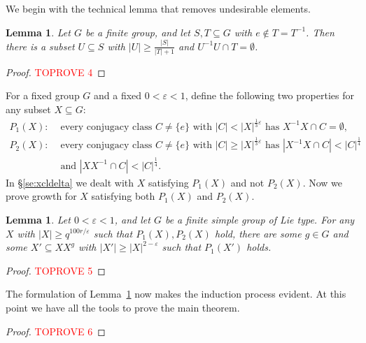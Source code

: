 \documentclass[a4paper]{article}
\newtheorem{lemma}[proposition]{Lemma}
\theoremstyle{definition}
\numberwithin{equation}{section}
\begin{document}
We begin with the technical lemma that removes undesirable elements.

\begin{lemma}\label{le:cutsmall}
Let $G$ be a finite group, and let $S,T\subseteq G$ with $e\notin T=T^{-1}$. Then there is a subset $U\subseteq S$ with $|U|\geq\frac{|S|}{|T|+1}$ and $U^{-1}U\cap T=\emptyset$.
\end{lemma}

\begin{proof}\textcolor{red}{TOPROVE 4}\end{proof}

For a fixed group $G$ and a fixed $0<\varepsilon<1$, define the following two properties for any subset $X\subseteq G$:
\begin{align*}
P_{1}(X): & \text{ every conjugacy class $C\neq\{e\}$ with $|C|<|X|^{\frac{1}{3}\varepsilon}$ has $X^{-1}X\cap C=\emptyset$,} \\
P_{2}(X): & \text{ every conjugacy class $C\neq\{e\}$ with $|C|\geq|X|^{\frac{1}{3}\varepsilon}$ has $|X^{-1}X\cap C|<|C|^{\frac{1}{4}}$} \\
& \text{ and $|XX^{-1}\cap C|<|C|^{\frac{1}{4}}$.}
\end{align*}
In \S\ref{se:xcldelta} we dealt with $X$ satisfying $P_{1}(X)$ and not $P_{2}(X)$. Now we prove growth for $X$ satisfying both $P_{1}(X)$ and $P_{2}(X)$.

\begin{lemma}\label{le:xclsmall}
Let $0<\varepsilon<1$, and let $G$ be a finite simple group of Lie type. For any $X$ with $|X|\geq q^{100r/\varepsilon}$ such that $P_{1}(X),P_{2}(X)$ hold, there are some $g\in G$ and some $X'\subseteq XX^{g}$ with $|X'|\geq|X|^{2-\varepsilon}$ such that $P_{1}(X')$ holds.
\end{lemma}

\begin{proof}\textcolor{red}{TOPROVE 5}\end{proof}

The formulation of Lemma~\ref{le:xclsmall} now makes the induction process evident. At this point we have all the tools to prove the main theorem.

\begin{proof}\textcolor{red}{TOPROVE 6}\end{proof}
\end{document}

